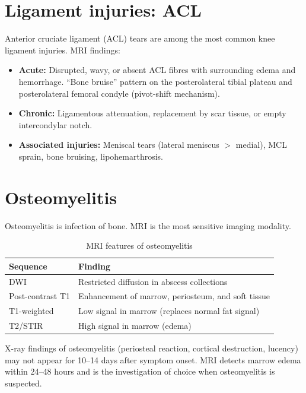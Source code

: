 \section{Ligament injuries: ACL}
Anterior cruciate ligament (ACL) tears are among the most common knee ligament injuries. MRI findings:
\begin{itemize}
    \item \textbf{Acute:} Disrupted, wavy, or absent ACL fibres with surrounding edema and hemorrhage. ``Bone bruise'' pattern on the posterolateral tibial plateau and posterolateral femoral condyle (pivot-shift mechanism).
    \item \textbf{Chronic:} Ligamentous attenuation, replacement by scar tissue, or empty intercondylar notch.
    \item \textbf{Associated injuries:} Meniscal tears (lateral meniscus $>$ medial), MCL sprain, bone bruising, lipohemarthrosis.
\end{itemize}

\section{Osteomyelitis}
Osteomyelitis is infection of bone. MRI is the most sensitive imaging modality.

\begin{table}[h]
\centering
\caption{MRI features of osteomyelitis}
\label{tab:osteo_mri}
\begin{tabular}{ll}
\hline
\textbf{Sequence} & \textbf{Finding} \\
\hline
DWI & Restricted diffusion in abscess collections \\
Post-contrast T1 & Enhancement of marrow, periosteum, and soft tissue \\
T1-weighted & Low signal in marrow (replaces normal fat signal) \\
T2/STIR & High signal in marrow (edema) \\
\hline
\end{tabular}
\end{table}

\begin{pearlbox}
X-ray findings of osteomyelitis (periosteal reaction, cortical destruction, lucency) may not appear for 10--14 days after symptom onset. MRI detects marrow edema within 24--48 hours and is the investigation of choice when osteomyelitis is suspected.
\end{pearlbox}

